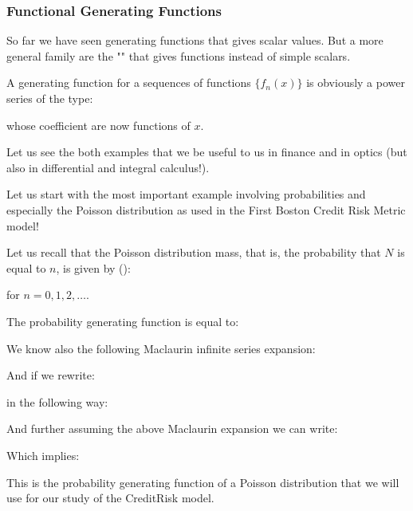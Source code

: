 	\subsubsection{Functional Generating Functions}
	So far we have seen generating functions that gives scalar values. But a more general family are the "" that gives functions instead of simple scalars.
	
	A generating function for a sequences of functions $\{f_n(x)\}$ is obviously a power series of the type:
	
	whose coefficient are now functions of $x$.
	
	Let us see the both examples that we be useful to us in finance and in optics (but also in differential and integral calculus!).
	
	Let us start with the most important example involving probabilities and especially the Poisson distribution as used in the First Boston Credit Risk Metric model!
	
	Let us recall that the Poisson distribution mass, that is, the probability that $N$ is equal to $n$, is given by ():
	
	for $n=0,1,2,\ldots$.

	The probability generating function is equal to:
	
	We know also the following Maclaurin infinite series expansion:
	
	And if we rewrite:
	
	in the following way:
	
	And further assuming the above Maclaurin expansion we can write:
	
	Which implies:
	
	This is the probability generating function of a Poisson distribution that we will use for our study of the CreditRisk model.
	
